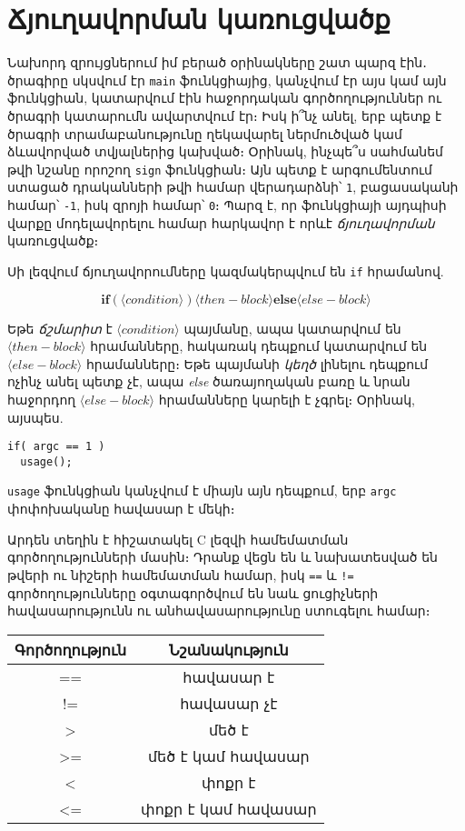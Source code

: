 \chapter{Ճյուղավորման կառուցվածք}

Նախորդ զրույցներում իմ բերած օրինակները շատ պարզ էին․ ծրագիրը սկսվում էր
\texttt{main} ֆունկցիայից, կանչվում էր այս կամ այն ֆունկցիան, կատարվում էին
հաջորդական գործողություններ ու ծրագրի կատարումն ավարտվում էր։ Իսկ ի՞նչ անել,
երբ պետք է ծրագրի տրամաբանությունը ղեկավարել ներմուծված կամ ձևավորված
տվյալներից կախված։ Օրինակ, ինչպե՞ս սահմանեմ թվի նշանը որոշող \texttt{sign}
ֆունկցիան։ Այն պետք է արգումենտում ստացած դրականների թվի համար վերադարձնի՝
\texttt{1}, բացասականի համար՝ \texttt{-1}, իսկ զրոյի համար՝ \texttt{0}։
Պարզ է, որ ֆունկցիայի այդպիսի վարքը մոդելավորելու համար հարկավոր է
որևէ \emph{ճյուղավորման} կառուցվածք։

Սի լեզվում ճյուղավորումները կազմակերպվում են \texttt{if} հրամանով.

\[
\mathbf{if}( \langle condition\rangle )
\langle then-block\rangle
\mathbf{else}
\langle else-block\rangle
\]

Եթե \emph{ճշմարիտ} է \(\langle condition\rangle\) պայմանը, ապա կատարվում
են \(\langle then-block\rangle\) հրամանները, հակառակ դեպքում կատարվում են
\(\langle else-block\rangle\) հրամանները։ Եթե պայմանի \emph{կեղծ} լինելու
դեպքում ոչինչ անել պետք չէ, ապա \emph{else} ծառայողական բառը և նրան հաջորդող
\(\langle else-block\rangle\) հրամանները կարելի է չգրել։ Օրինակ, այսպես.

\begin{verbatim}
if( argc == 1 )
  usage();
\end{verbatim}

\texttt{usage} ֆունկցիան կանչվում է միայն այն դեպքում, երբ \texttt{argc}
փոփոխականը հավասար է մեկի։

Արդեն տեղին է հիշատակել C լեզվի համեմատման գործողությունների մասին։ Դրանք
վեցն են և նախատեսված են թվերի ու նիշերի համեմատման համար, իսկ \verb|==| և
\verb|!=| գործողությունները օգտագործվում են նաև ցուցիչների հավասարությունն
ու անհավասարությունը ստուգելու համար։

\begin{center}
\begin{tabular}{c|c}
Գործողություն & Նշանակություն \\
\hline
== & հավասար է \\
!= & հավասար չէ \\
>  & մեծ է \\
>= & մեծ է կամ հավասար \\
<  & փոքր է \\
<= & փոքր է կամ հավասար \\
\end{tabular}
\end{center}

